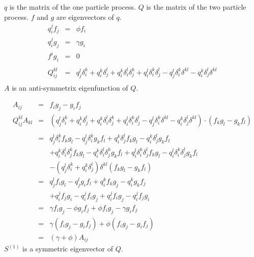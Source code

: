 \documentclass{article}
\begin{document}
$q$ is the matrix of the one particle process. $Q$ is the matrix of the 
two particle process. $f$ and $g$ are eigenvectors of $q$. 
\begin{eqnarray*}
  q_i^jf_j &=& \phi f_i\\
  q_i^jg_j &=& \gamma g_i\\
  f^ig_i &=& 0 \\
\\
  Q_{ij}^{kl} &=& 
        q_j^l\delta_i^k + 
        q_i^k\delta_j^l + 
        q_i^k\delta_i^l\delta_j^k +
        q_i^l\delta_i^k\delta_j^l - 
        q_j^l\delta_i^k\delta^{kl} - 
        q_i^k\delta_j^l\delta^{kl}\\
\end{eqnarray*}
$A$ is an anti-symmetrix eigenfunction of $Q$.

\begin{eqnarray*}
  A_{ij} &=& f_ig_j - g_if_j
\\
  Q_{ij}^{kl}A_{kl} &=& 
                \left(  q_j^l\delta_i^k + 
                        q_i^k\delta_j^l + 
                        q_i^k\delta_i^l\delta_j^k +
                        q_i^l\delta_i^k\delta_j^l - 
                        q_j^l\delta_i^k\delta^{kl} -    
                        q_i^k\delta_j^l\delta^{kl}\right)
        \cdot  \left(f_kg_l - g_kf_l\right)\\
\\      
  &=& q_j^l\delta_i^kf_kg_l - q_j^l\delta_i^kg_kf_l + 
      q_i^k\delta_j^lf_kg_l - q_i^k\delta_j^lg_kf_l \\
      && + q_i^k\delta_i^l\delta_j^kf_kg_l - q_i^k\delta_i^l\delta_j^kg_kf_l + 
      q_i^l\delta_i^k\delta_j^lf_kg_l - q_i^l\delta_i^k\delta_j^lg_kf_l \\
      && - \left(q_j^l\delta_i^k + q_i^k\delta_j^l\right) \delta^{kl}
      \left(f_kg_l - g_kf_l\right)\\
  &=& q_j^lf_ig_l - q_j^lg_if_l + q_i^kf_kg_j - q_i^kg_kf_j \\
      && + q_i^jf_jg_i - q_i^jf_ig_j + q_i^jf_ig_j - q_i^jf_jg_i \\
  &=& \gamma f_ig_j - \phi g_if_j + \phi f_ig_j - \gamma g_if_j \\
  &=& \gamma (f_ig_j - g_if_j) + \phi (f_ig_j - g_if_j) \\ 
  &=& \left(\gamma + \phi\right)A_{ij}
\end{eqnarray*}
$S^{(1)}$ is a symmetric eigenvector of $Q$.
\end{document}
